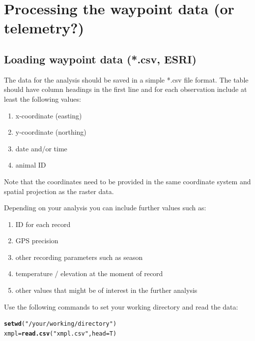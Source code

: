 \documentclass[11pt, a4paper]{article}\usepackage[]{graphicx}\usepackage[]{color}
\makeatletter
\newcommand{\hlstr}[1]{\textcolor[rgb]{0.192,0.494,0.8}{#1}}%
\newcommand{\hlstd}[1]{\textcolor[rgb]{0.345,0.345,0.345}{#1}}%
\newcommand{\hlkwb}[1]{\textcolor[rgb]{0.69,0.353,0.396}{#1}}%
\newcommand{\hlkwc}[1]{\textcolor[rgb]{0.333,0.667,0.333}{#1}}%
\newcommand{\hlkwd}[1]{\textcolor[rgb]{0.737,0.353,0.396}{\textbf{#1}}}%
\newenvironment{kframe}{%
 \def\at@end@of@kframe{}%
 \ifinner\ifhmode%
  \def\at@end@of@kframe{\end{minipage}}%
  \begin{minipage}{\columnwidth}%
 \fi\fi%
 \def\FrameCommand##1{\hskip\@totalleftmargin \hskip-\fboxsep
 \colorbox{shadecolor}{##1}\hskip-\fboxsep
     \hskip-\linewidth \hskip-\@totalleftmargin \hskip\columnwidth}%
 \MakeFramed {\advance\hsize-\width
   \@totalleftmargin\z@ \linewidth\hsize
   \@setminipage}}%
 {\par\unskip\endMakeFramed%
 \at@end@of@kframe}
\newenvironment{knitrout}{}{} %
\makeatother
\begin{document}
\section{Processing the waypoint data (or telemetry?)}

\subsection{Loading waypoint data (*.csv, ESRI)}%

The data for the analysis should be saved in a simple *.csv file format. The table should have column headings in the first line and for each observation include at least the following values: 
\begin{enumerate}
\item{x-coordinate (easting)}
\item{y-coordinate (northing)}
\item{date and/or time}
\item{animal ID}
\end{enumerate}

\noindent Note that the coordinates need to be provided in the same coordinate system and spatial projection as the raster data.

Depending on your analysis you can include further values such as:
\begin{enumerate}
\item{ID for each record}
\item{GPS precision}
\item{other recording parameters such as season}
\item{temperature / elevation at the moment of record}
\item{other values that might be of interest in the further analysis}
\end{enumerate}


\noindent Use the following commands to set your working directory and read the data:
\begin{knitrout}
\color{fgcolor}\begin{kframe}
\begin{alltt}
\hlkwd{setwd}\hlstd{(}\hlstr{"/your/working/directory"}\hlstd{)}
\hlstd{xmpl} \hlkwb{=} \hlkwd{read.csv}\hlstd{(}\hlstr{"xmpl.csv"}\hlstd{,} \hlkwc{head}\hlstd{=T)}
\end{alltt}
\end{kframe}
\end{knitrout}
\end{document}
